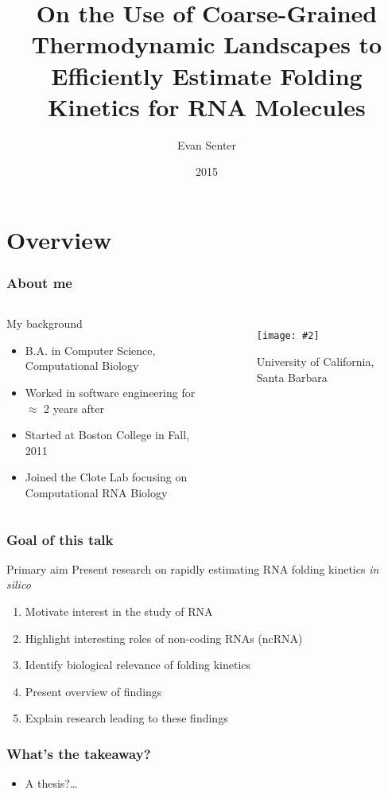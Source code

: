 \documentclass{beamer}
\title[Coarse-Grained RNA Folding Kinetics]{On the Use of Coarse-Grained Thermodynamic Landscapes to Efficiently Estimate Folding Kinetics for RNA Molecules}
\author{Evan Senter}
\date{2015}
\newcommand{\slidefigure}[2][1]{\texttt{[image: \#2]}}
\begin{document}
\frame{\titlepage}

\section{Overview}

\begin{frame}
  \frametitle{About me}
  \begin{columns}
  \begin{block}{My background}
  \begin{itemize}
  \item B.A. in Computer Science, Computational Biology
  \item Worked in software engineering for $\approx$ 2 years after
  \item Started at Boston College in Fall, 2011
  \item Joined the Clote Lab focusing on Computational RNA Biology
  \end{itemize}
  \end{block}

  \begin{figure}
  \centering
  \slidefigure{ucsb}
  \caption{University of California, Santa Barbara}
  \end{figure}
  \end{columns}
\end{frame}

\begin{frame}
  \frametitle{Goal of this talk}
  \begin{block}{Primary aim}
    Present research on rapidly estimating RNA folding kinetics {\em in silico}
  \end{block}

  \begin{enumerate}
  \item Motivate interest in the study of RNA
  \item Highlight interesting roles of non-coding RNAs (ncRNA)
  \item Identify biological relevance of folding kinetics
  \item Present overview of findings
  \item Explain research leading to these findings
  \end{enumerate}
\end{frame}

\begin{frame}
  \frametitle{What's the takeaway?}

  \begin{itemize}
  \pause
  \item A thesis?\dots
  \end{itemize}
\end{frame}
\end{document}
